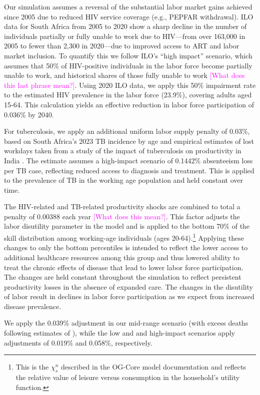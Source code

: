 \documentclass[letterpaper,12pt]{article}
\theoremstyle{definition}
\begin{document}
\begin{spacing}{1.5}
Our simulation assumes a reversal of the substantial labor market gains achieved since 2005 due to reduced HIV service coverage (e.g., PEPFAR withdrawal). ILO data for South Africa from 2005 to 2020 show a sharp decline in the number of individuals partially or fully unable to work due to HIV—from over 163,000 in 2005 to fewer than 2,300 in 2020—due to improved access to ART and labor market inclusion. To quantify this we follow ILO's ``high impact'' scenario, which assumes that 50\% of HIV-positive individuals in the labor force become partially unable to work, and historical shares of those fully unable to work \textcolor{magenta}{[What does this last phrase mean?]}. Using 2020 ILO data, we apply this 50\% impairment rate to the estimated HIV prevalence in the labor force (23.9\%), covering adults aged 15-64. This calculation yields an effective reduction in labor force participation of 0.036\% by 2040.

For tuberculosis, we apply an additional uniform labor supply penalty of 0.03\%, based on South Africa's 2023 TB incidence by age and empirical estimates of lost workdays taken from a study of the impact of tuberculosis on productivity in India \citep{Keogh2024}. The estimate assumes a high-impact scenario of 0.1442\% absenteeism loss per TB case, reflecting reduced access to diagnosis and treatment. This is applied to the prevalence of TB in the working age population and held constant over time.

The HIV-related and TB-related productivity shocks are combined to total a penalty of 0.00388 each year \textcolor{magenta}{[What does this mean?]}. This factor adjusts the labor disutility parameter in the model and is applied to the bottom 70\% of the skill distribution among working-age individuals (ages 20-64).\footnote{This is the $\chi^n_s$ described in the OG-Core model documentation and reflects the relative value of leisure versus consumption in the household's utility function.} Applying these changes to only the bottom percentiles is intended to reflect the lower access to additional healthcare resources among this group and thus lowered ability to treat the chronic effects of disease that lead to lower labor force participation.  The changes are held constant throughout the simulation to reflect persistent productivity losses in the absence of expanded care.  The changes in the disutility of labor result in declines in labor force participation as we expect from increased disease prevalence.

We apply the 0.039\% adjustment in our mid-range scenario (with excess deaths following estimates of \citet{Gandhi2025}), while the low and and high-impact scenarios apply adjustments of 0.019\% and 0.058\%, respectively.


\end{spacing}
\end{document}
